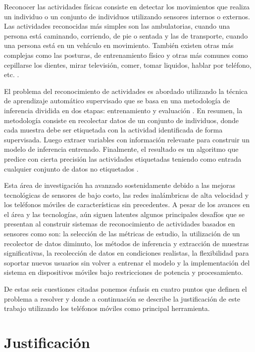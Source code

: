 Reconocer las actividades físicas consiste en detectar los movimientos
que realiza un individuo o un conjunto de individuos utilizando sensores
internos o externos. Las actividades reconocidas más simples son las
ambulatorias, cuando una persona está caminando, corriendo, de pie
o sentada y las de transporte, cuando una persona está en un vehículo
en movimiento. También existen otras más complejas como las posturas,
de entrenamiento físico y otras más comunes como cepillarse los dientes,
mirar televisión, comer, tomar liquidos, hablar por teléfono, etc.
\cite{LaraLabrador2013}.

El problema del reconocimiento de actividades es abordado utilizando
la técnica de aprendizaje automático supervisado que se basa en una
metodología de inferencia dividida en dos etapas: entrenamiento y
evaluación \cite{LaraLabrador2013,Kwapisz2011}. En resumen, la metodología
consiste en recolectar datos de un conjunto de individuos, donde cada
muestra debe ser etiquetada con la actividad identificada de forma
supervisada. Luego extraer variables con información relevante para
construir un modelo de inferencia entrenado. Finalmente, el resultado
es un algoritmo que predice con cierta precisión las actividades etiquetadas
teniendo como entrada cualquier conjunto de datos no etiquetados \cite{Bao2004}.

Esta área de investigación ha avanzado sostenidamente debido a las
mejoras tecnológicas de sensores de bajo costo, las redes inalámbricas
de alta velocidad y los teléfonos móviles de características sin precedentes\cite{chen2012sensor}.
A pesar de los avances en el área y las tecnologías, aún siguen latentes
algunos principales desafíos que se presentan al construir sistemas
de reconocimiento de actividades basados en sensores como son: la
selección de las métricas de estudio, la utilización de un recolector
de datos diminuto, los métodos de inferencia y extracción de muestras
significativas, la recolección de datos en condiciones realistas,
la flexibilidad para soportar nuevos usuarios sin volver a entrenar
el modelo y la implementación del sistema en dispositivos móviles
bajo restricciones de potencia y procesamiento\cite{LaraLabrador2013}. 

De estas seis cuestiones citadas ponemos énfasis en cuatro puntos
que definen el problema a resolver y donde a continuación se describe
la justificación de este trabajo utilizando los teléfonos móviles
como principal herramienta.

\section{Justificación}

